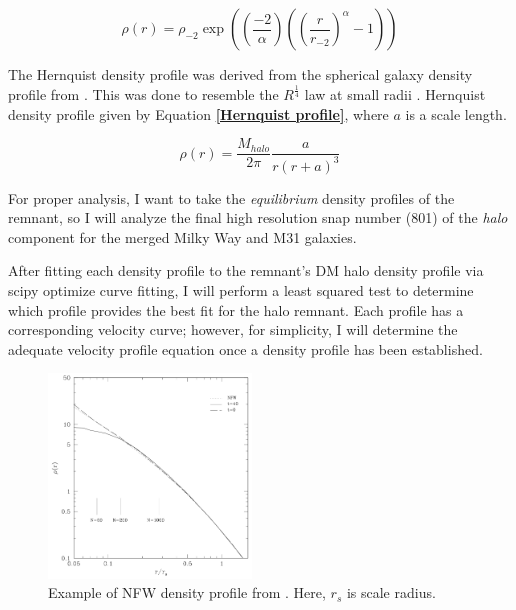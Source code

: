 \begin{equation}
    \rho(r) = \rho_{-2}\exp \left( \left( \frac{-2}{\alpha} \right) \left( \left( \frac{r}{r_{-2}} \right)^{\alpha} -1\right)\right)
    \label{Einasto profile}
\end{equation}
\smallskip

The Hernquist density profile was derived from the spherical galaxy density profile from \cite{Jaffe1983}. This was done to resemble the $R^{\frac{1}{4}}$ law at small radii \cite{Hernquist1990}. Hernquist density profile given by Equation \textbf{\ref{Hernquist profile}}, where $a$ is a scale length.

\begin{equation}
    \rho(r) = \frac{M_{halo}}{2\pi} \frac{a}{r(r+a)^{3}}
    \label{Hernquist profile}
\end{equation}
\smallskip

For proper analysis, I want to take the \textit{equilibrium} density profiles of the remnant, so I will analyze the final high resolution snap number (801) of the \textit{halo} component for the merged Milky Way and M31 galaxies.

After fitting each density profile to the remnant's DM halo density profile via scipy optimize curve fitting, I will perform a least squared test to determine which profile provides the best fit for the halo remnant. Each profile has a corresponding velocity curve; however, for simplicity, I will determine the adequate velocity profile equation once a density profile has been established. 

\begin{figure}
  \begin{center}
    \includegraphics[width=0.48\textwidth]{Figures/NFWdensprof.png}
  \end{center}
  \caption{Example of NFW density profile from \cite{Prada2013}. Here, $r_{s}$ is scale radius.}
  \label{NFW prof graph}
\end{figure}

